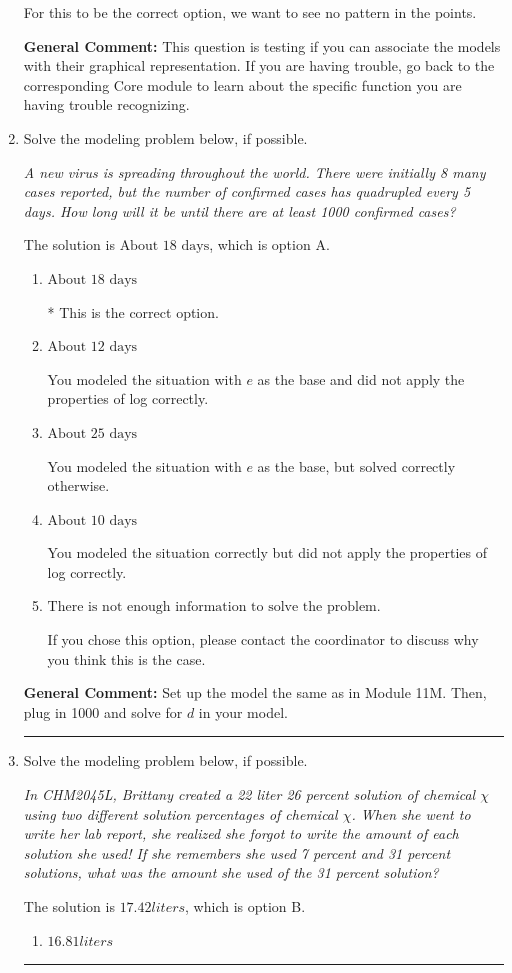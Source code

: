 \documentclass{extbook}[14pt]
\newcommand{\litem}[1]{\item #1

\rule{\textwidth}{0.4pt}}
\begin{document}
\begin{enumerate}
{\begin{enumerate}[label=\Alph*.]
For this to be the correct option, we want to see no pattern in the points.
\end{enumerate}

\textbf{General Comment:} This question is testing if you can associate the models with their graphical representation. If you are having trouble, go back to the corresponding Core module to learn about the specific function you are having trouble recognizing.
}
\litem{
Solve the modeling problem below, if possible.

\begin{center}
    \textit{ A new virus is spreading throughout the world. There were initially 8 many cases reported, but the number of confirmed cases has quadrupled every 5 days. How long will it be until there are at least 1000 confirmed cases? }
\end{center}
The solution is \( \text{About } 18 \text{ days} \), which is option A.\begin{enumerate}[label=\Alph*.]
\item \( \text{About } 18 \text{ days} \)

* This is the correct option.
\item \( \text{About } 12 \text{ days} \)

You modeled the situation with $e$ as the base and did not apply the properties of log correctly.
\item \( \text{About } 25 \text{ days} \)

You modeled the situation with $e$ as the base, but solved correctly otherwise.
\item \( \text{About } 10 \text{ days} \)

You modeled the situation correctly but did not apply the properties of log correctly.
\item \( \text{There is not enough information to solve the problem.} \)

If you chose this option, please contact the coordinator to discuss why you think this is the case.
\end{enumerate}

\textbf{General Comment:} Set up the model the same as in Module 11M. Then, plug in 1000 and solve for $d$ in your model.
}
\litem{
Solve the modeling problem below, if possible.

\begin{center}
    \textit{ In CHM2045L, Brittany created a 22 liter 26 percent solution of chemical $\chi$ using two different solution percentages of chemical $\chi$. When she went to write her lab report, she realized she forgot to write the amount of each solution she used! If she remembers she used 7 percent and 31 percent solutions, what was the amount she used of the 31 percent solution? }
\end{center}
The solution is \( 17.42 liters \), which is option B.\begin{enumerate}[label=\Alph*.]
\item \( 16.81 liters \)


\end{enumerate}}
\end{enumerate}
\end{document}
